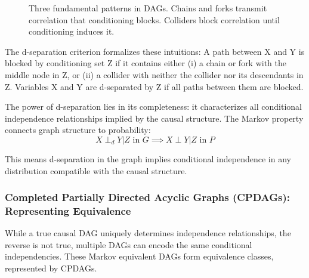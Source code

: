 \begin{figure}[h!]
\centering
{}
\caption{Three fundamental patterns in DAGs. Chains and forks transmit correlation that conditioning blocks. Colliders block correlation until conditioning induces it.}
\label{fig:dag_patterns}
\end{figure}

The d-separation criterion formalizes these intuitions: A path between X and Y is blocked by conditioning set Z if it contains either (i) a chain or fork with the middle node in Z, or (ii) a collider with neither the collider nor its descendants in Z. Variables X and Y are d-separated by Z if all paths between them are blocked.

The power of d-separation lies in its completeness: it characterizes all conditional independence relationships implied by the causal structure. The Markov property connects graph structure to probability:
\begin{equation}
X \perp_d Y | Z \text{ in } G \implies X \perp Y | Z \text{ in } P
\end{equation}

This means d-separation in the graph implies conditional independence in any distribution compatible with the causal structure.

\subsubsection{Completed Partially Directed Acyclic Graphs (CPDAGs): Representing Equivalence}

While a true causal DAG uniquely determines independence relationships, the reverse is not true, multiple DAGs can encode the same conditional independencies. These Markov equivalent DAGs form equivalence classes, represented by CPDAGs.

